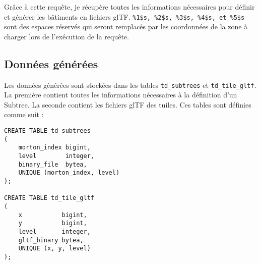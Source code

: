 Grâce à cette requête, je récupère toutes les informations nécessaires pour définir et générer les bâtiments en fichiers glTF. \texttt{\%1\$s, \%2\$s, \%3\$s, \%4\$s, et \%5\$s} sont des espaces réservés qui seront remplacés par les coordonnées de la zone à charger lors de l'exécution de la requête.

\subsection{Données générées}

Les données générées sont stockées dans les tables \texttt{td\_subtrees} et \texttt{td\_tile\_gltf}. La première contient toutes les informations nécessaires à la définition d'un Subtree. La seconde contient les fichiers glTF des tuiles. Ces tables sont définies comme suit :

\begin{verbatim}
CREATE TABLE td_subtrees
(
    morton_index bigint,
    level        integer,
    binary_file  bytea,
    UNIQUE (morton_index, level)
);

CREATE TABLE td_tile_gltf
(
    x           bigint,
    y           bigint,
    level       integer,
    gltf_binary bytea,
    UNIQUE (x, y, level)
);
\end{verbatim}